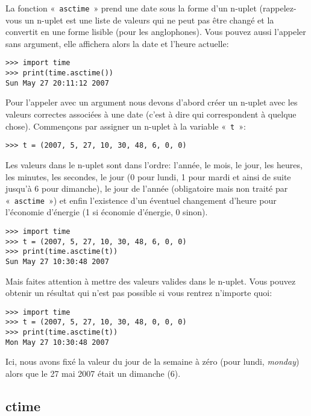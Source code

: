 La fonction « \verb+asctime+ » prend une date sous la forme d'un n-uplet (rappelez-vous un n-uplet est une liste de valeurs qui ne peut pas être changé et la convertit en une forme lisible (pour les anglophones). Vous pouvez aussi l'appeler sans argument, elle affichera alors la date et l'heure actuelle:

\begin{Verbatim}[frame=single,rulecolor=\color{gray}]
>>> import time
>>> print(time.asctime())
Sun May 27 20:11:12 2007
\end{Verbatim}

Pour l'appeler avec un argument nous devons d'abord créer un n-uplet avec les valeurs correctes associées à une date (c'est à dire qui correspondent à quelque chose). Commençons par assigner un n-uplet à la variable « \texttt{t} »:

\begin{Verbatim}[frame=single,rulecolor=\color{gray}]
>>> t = (2007, 5, 27, 10, 30, 48, 6, 0, 0)
\end{Verbatim}

Les valeurs dans le n-uplet sont dans l'ordre: l'année, le mois, le jour, les heures, les minutes, les secondes, le jour (0 pour lundi, 1 pour mardi et ainsi de suite jusqu'à 6 pour dimanche), le jour de l'année (obligatoire mais non traité par « \texttt{asctime} ») et enfin l'existence d'un éventuel changement d'heure pour l'économie d'énergie (1 si économie d'énergie, 0 sinon).

\begin{Verbatim}[frame=single,rulecolor=\color{gray}]
>>> import time
>>> t = (2007, 5, 27, 10, 30, 48, 6, 0, 0)
>>> print(time.asctime(t))
Sun May 27 10:30:48 2007
\end{Verbatim}

Mais faites attention à mettre des valeurs valides dans le n-uplet. Vous pouvez obtenir un résultat qui n'est pas possible si vous rentrez n'importe quoi:

\begin{Verbatim}[frame=single,rulecolor=\color{gray}]
>>> import time
>>> t = (2007, 5, 27, 10, 30, 48, 0, 0, 0)
>>> print(time.asctime(t))
Mon May 27 10:30:48 2007
\end{Verbatim}

Ici, nous avons fixé la valeur du jour de la semaine à zéro (pour lundi, \emph{monday}) alors que le 27 mai 2007 était un dimanche (6).

\subsection{ctime}

